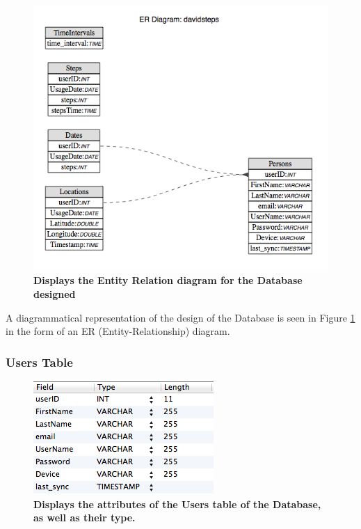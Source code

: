 \documentclass{l4proj}
\begin{document}
\begin{figure}[ht!]
\centering
\includegraphics[scale=0.5]{images/screenshots/erdiagram.png}
\caption{\textbf{Displays the Entity Relation diagram for the Database designed}}
\label{design:erdiagram}
\end{figure}

A diagrammatical representation of the design of the Database is seen in Figure \ref{design:erdiagram} in the form of an ER (Entity-Relationship) diagram.

\subsubsection{Users Table}

\begin{figure}[ht!]
\centering
\includegraphics[scale=1.0]{images/screenshots/usersscreen.png}
\caption{\textbf{Displays the attributes of the Users table of the Database, as well as their type.}}
\label{design:usersscreen}
\end{figure}
\end{document}
